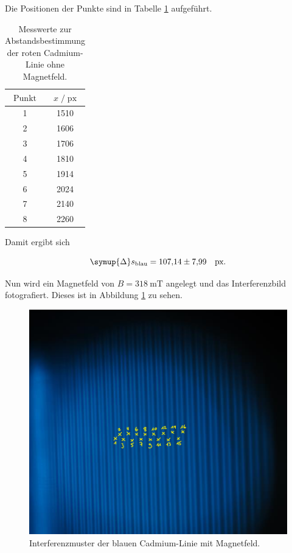 Die Positionen der Punkte sind in Tabelle \ref{tab:mess4} aufgeführt.

\begin{table}[H]
    \centering
    \caption{Messwerte zur Abstandsbestimmung der roten Cadmium-Linie ohne Magnetfeld.}
    \label{tab:mess4}
    \begin{tabular}{c c}
    \toprule
    $\text{Punkt}$ & $x \;/\; \text{px}$ \\
    \midrule
        1 & 1510\\
        2 & 1606\\
        3 & 1706\\
        4 & 1810\\
        5 & 1914\\
        6 & 2024\\
        7 & 2140\\
        8 & 2260\\
    \bottomrule
    \end{tabular}
\end{table}

Damit ergibt sich 

\begin{equation*}
    \symup{\Delta} s_\text{blau} = \num{107.14+-7.99} \quad \text{px}.
\end{equation*}

Nun wird ein Magnetfeld von $B = \SI{318}{\milli\tesla}$ angelegt und das Interferenzbild fotografiert. Dieses 
ist in Abbildung \ref{fig:blau_mit} zu sehen. 

\begin{figure}
    \centering
    \includegraphics[scale=0.35]{content/blau_mit.png}
    \vspace{-10pt}
    \caption{Interferenzmuster der blauen Cadmium-Linie mit Magnetfeld.}
    \label{fig:blau_mit}
\end{figure}

